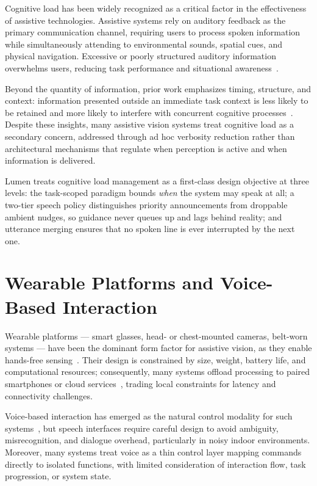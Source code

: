 Cognitive load has been widely recognized as a critical factor in the effectiveness
of assistive technologies. Assistive systems rely on auditory feedback as the primary
communication channel, requiring users to process spoken information while
simultaneously attending to environmental sounds, spatial cues, and physical
navigation. Excessive or poorly structured auditory information overwhelms users,
reducing task performance and situational
awareness~\cite{hossain2010cognitive, martinez2014cognitive}.

Beyond the quantity of information, prior work emphasizes timing, structure, and
context: information presented outside an immediate task context is less likely to be
retained and more likely to interfere with concurrent cognitive
processes~\cite{wickens2008multiple}. Despite these insights, many assistive vision
systems treat cognitive load as a secondary concern, addressed through ad hoc
verbosity reduction rather than architectural mechanisms that regulate when
perception is active and when information is delivered.

Lumen treats cognitive load management as a first-class design objective at three
levels: the task-scoped paradigm bounds \emph{when} the system may speak at all; a
two-tier speech policy distinguishes priority announcements from droppable ambient
nudges, so guidance never queues up and lags behind reality; and utterance merging
ensures that no spoken line is ever interrupted by the next one.

\section{Wearable Platforms and Voice-Based Interaction}
\label{sec:wearable_voice}

Wearable platforms --- smart glasses, head- or chest-mounted cameras, belt-worn
systems --- have been the dominant form factor for assistive vision, as they enable
hands-free sensing~\cite{tapu2014wearable, dakopoulos2010wearable}. Their design is
constrained by size, weight, battery life, and computational resources; consequently,
many systems offload processing to paired smartphones or cloud
services~\cite{chen2015wearable}, trading local constraints for latency and
connectivity challenges.

Voice-based interaction has emerged as the natural control modality for such
systems~\cite{porzi2018assistive}, but speech interfaces require careful design to
avoid ambiguity, misrecognition, and dialogue overhead, particularly in noisy indoor
environments. Moreover, many systems treat voice as a thin control layer mapping
commands directly to isolated functions, with limited consideration of interaction
flow, task progression, or system state.

